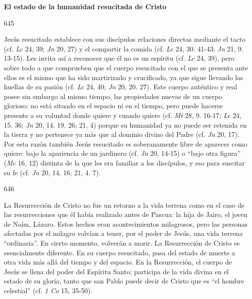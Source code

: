 			\begin{ccebody}\textbf{El estado de la humanidad resucitada de Cristo}\end{ccebody}
			
			\begin{ccebody}\begin{ccenumber}645\end{ccenumber} Jesús resucitado establece con sus discípulos relaciones directas mediante el tacto (cf. \textit{Lc} 24, 39; \textit{Jn} 20, 27) y el compartir la comida (cf. \textit{Lc} 24, 30. 41-43; \textit{Jn} 21, 9. 13-15). Les invita así a reconocer que él no es un espíritu (cf. \textit{Lc} 24, 39), pero sobre todo a que comprueben que el cuerpo resucitado con el que se presenta ante ellos es el mismo que ha sido martirizado y crucificado, ya que sigue llevando las huellas de su pasión (cf. \textit{Lc} 24, 40; \textit{Jn} 20, 20. 27). Este cuerpo auténtico y real posee sin embargo al mismo tiempo, las propiedades nuevas de un cuerpo glorioso: no está situado en el espacio ni en el tiempo, pero puede hacerse presente a su voluntad donde quiere y cuando quiere (cf. \textit{Mt} 28, 9. 16-17; \textit{Lc} 24, 15. 36; \textit{Jn} 20, 14. 19. 26; 21, 4) porque su humanidad ya no puede ser retenida en la tierra y no pertenece ya más que al dominio divino del Padre (cf. \textit{Jn} 20, 17). Por esta razón también Jesús resucitado es soberanamente libre de aparecer como quiere: bajo la apariencia de un jardinero (cf. \textit{Jn} 20, 14-15) o “bajo otra figura” (\textit{Mc} 16, 12) distinta de la que les era familiar a los discípulos, y eso para suscitar su fe (cf. \textit{Jn} 20, 14. 16; 21, 4. 7).\end{ccebody}
			
			\begin{ccebody}\begin{ccenumber}646\end{ccenumber} La Resurrección de Cristo no fue un retorno a la vida terrena como en el caso de las resurrecciones que él había realizado antes de Pascua: la hija de Jairo, el joven de Naím, Lázaro. Estos hechos eran acontecimientos milagrosos, pero las personas afectadas por el milagro volvían a tener, por el poder de Jesús, una vida terrena “ordinaria”. En cierto momento, volverán a morir. La Resurrección de Cristo es esencialmente diferente. En su cuerpo resucitado, pasa del estado de muerte a otra vida más allá del tiempo y del espacio. En la Resurrección, el cuerpo de Jesús se llena del poder del Espíritu Santo; participa de la vida divina en el estado de su gloria, tanto que san Pablo puede decir de Cristo que es “el hombre celestial” (cf. \textit{1 Co} 15, 35-50).\end{ccebody}
			
